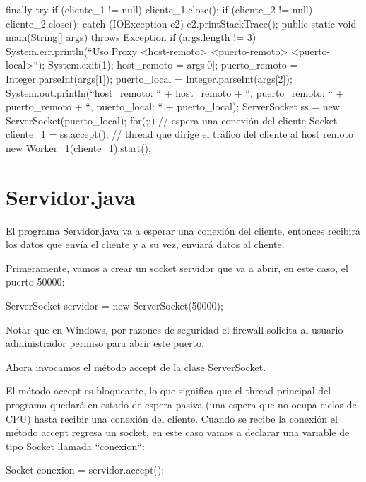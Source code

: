 \documentclass[11pt,a4paper,oneside]{book}
\begin{document}
\begin{SourceCode}
{{{      finally
      {
        try
        {
          if (cliente_1 != null) cliente_1.close();
          if (cliente_2 != null) cliente_2.close();
        }
        catch (IOException e2)
        {
          e2.printStackTrace();
        }
      }
    }
  }
  public static void main(String[] args) throws Exception
  {
    if (args.length != 3)
    { 
      System.err.println(``Uso:\njava Proxy <host-remoto> <puerto-remoto> <puerto-local>``);
      System.exit(1);
    }
    host_remoto = args[0];
    puerto_remoto = Integer.parseInt(args[1]);
    puerto_local = Integer.parseInt(args[2]);
    System.out.println(``host_remoto: `` + host_remoto + ``, puerto_remoto: `` + puerto_remoto + ``, puerto_local: `` + puerto_local);
    ServerSocket ss = new ServerSocket(puerto_local);
    for(;;)
    {
      // espera una conexión del cliente
      Socket cliente_1 = ss.accept();
      // thread que dirige el tráfico del cliente al host remoto
      new Worker_1(cliente_1).start();
    }
  }
}
\end{SourceCode}

\chapter{Servidor.java}

El programa Servidor.java va a esperar una conexión del cliente, entonces recibirá los datos que envía el cliente y a su vez, enviará datos al cliente.

Primeramente, vamos a crear un socket servidor que va a abrir, en este caso, el puerto 50000:

\begin{SourceCode}
ServerSocket servidor = new ServerSocket(50000);
\end{SourceCode}

Notar que en Windows, por razones de seguridad el firewall solicita al usuario administrador permiso para abrir este puerto.

Ahora invocamos el método accept de la clase ServerSocket.

El método accept es bloqueante, lo que significa que el thread principal del programa quedará en estado de espera pasiva (una espera que no ocupa ciclos de CPU) hasta recibir una conexión del cliente. Cuando se recibe la conexión el método accept regresa un socket, en este caso vamos a declarar una variable de tipo Socket llamada ``conexion``:

\begin{SourceCode}
Socket conexion = servidor.accept();
\end{SourceCode}
\end{document}
